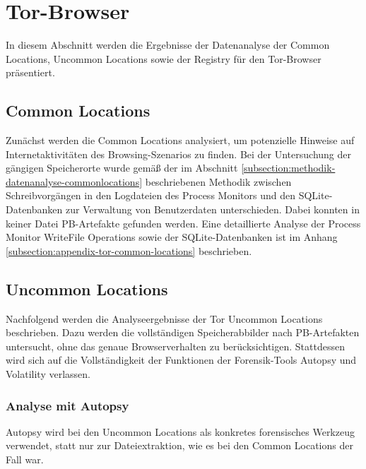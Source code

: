 

\newpage




\section{Tor-Browser}\label{section:ergebnisse-tor}

In diesem Abschnitt werden die Ergebnisse der Datenanalyse der Common Locations, Uncommon Locations sowie der Registry für den Tor-Browser präsentiert.

\subsection*{Common Locations}
Zunächst werden die Common Locations analysiert, um potenzielle Hinweise auf Internetaktivitäten des Browsing-Szenarios zu finden. Bei der Untersuchung der gängigen Speicherorte wurde gemäß der im Abschnitt \ref{subsection:methodik-datenanalyse-commonlocations} beschriebenen Methodik zwischen Schreibvorgängen in den Logdateien des Process Monitors und den SQLite-Datenbanken zur Verwaltung von Benutzerdaten unterschieden. Dabei konnten in keiner Datei PB-Artefakte gefunden werden. Eine detaillierte Analyse der Process Monitor \glqq{}WriteFile\grqq{} Operations sowie der SQLite-Datenbanken ist im Anhang \ref{subsection:appendix-tor-common-locations} beschrieben.

\subsection*{Uncommon Locations}
Nachfolgend werden die Analyseergebnisse der Tor Uncommon Locations beschrieben.
Dazu werden die vollständigen Speicherabbilder nach PB-Artefakten untersucht, ohne das genaue Browserverhalten zu berücksichtigen. Stattdessen wird sich auf die Vollständigkeit der Funktionen der Forensik-Tools Autopsy und Volatility verlassen.

\subsubsection*{Analyse mit Autopsy}
Autopsy wird bei den Uncommon Locations als konkretes forensisches Werkzeug verwendet, statt nur zur Dateiextraktion, wie es bei den Common Locations der Fall war.


